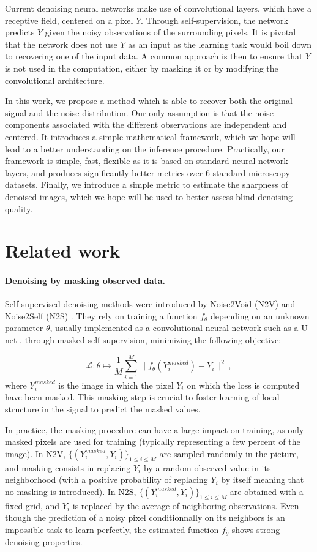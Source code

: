 \documentclass{article}
\begin{document}
Current denoising neural networks make use of convolutional layers, which have a receptive field, centered on a pixel $Y$. Through self-supervision, the network predicts $Y$ given the noisy observations of the surrounding pixels. It is pivotal that the network does not use $Y$ as an input as the learning task would boil down to recovering one of the input data. A common approach is then to ensure that $Y$ is not used in the computation, either by masking it or by modifying the convolutional architecture.

In this work, we propose a method which is able to recover both the original signal and the noise distribution. Our only assumption is that the noise components associated with the different observations are independent and centered. It introduces a simple mathematical framework, which we hope will lead to a better understanding on the inference procedure. Practically, our framework is simple, fast, flexible as it is based on standard neural network layers, and produces significantly better metrics over 6 standard microscopy datasets. Finally, we introduce a simple metric to estimate the sharpness of denoised images, which we hope will be used to better assess blind denoising quality.%

\section{Related work}
\label{sec:related}
\paragraph{Denoising by masking observed data.}
Self-supervised denoising methods were introduced by Noise2Void (N2V) \cite{krull2018noise2void} and Noise2Self (N2S) \cite{batson2019noise2self}. They rely on training a function $f_\theta$ depending on an unknown parameter $\theta$, usually  implemented as a convolutional neural network such as a U-net \cite{ronneberger2015u}, through masked self-supervision, minimizing the following objective:

$$\mathcal{L}: \theta\mapsto \frac{1}{M}\sum_{i=1}^M \|f_\theta(Y^{masked}_i) - Y_i\|^2\,, $$
where $Y^{masked}_i$ is the image in which the pixel $Y_i$  on which the loss is computed  have been masked. This masking step is crucial to foster learning of  local structure in the signal to predict the masked values.

In practice, the masking procedure can have a large impact on training, as only masked pixels are used for training (typically representing a few percent of the image). In N2V, $\{(Y^{masked}_i,Y_i)\}_{1\leqslant i\leqslant M}$ are sampled  randomly in the picture, and masking consists in replacing $Y_i$ by a random observed value in its neighborhood (with a positive probability of replacing $Y_i$ by itself meaning that no masking is introduced). In N2S,  $\{(Y^{masked}_i,Y_i)\}_{1\leqslant i\leqslant M}$ are obtained with  a fixed grid, and $Y_i$ is replaced by the average of neighboring observations. Even though the prediction of a noisy pixel conditionnally on its neighbors is an impossible task to learn perfectly, the estimated function $f_{\hat \theta}$ shows strong denoising properties.
\end{document}
